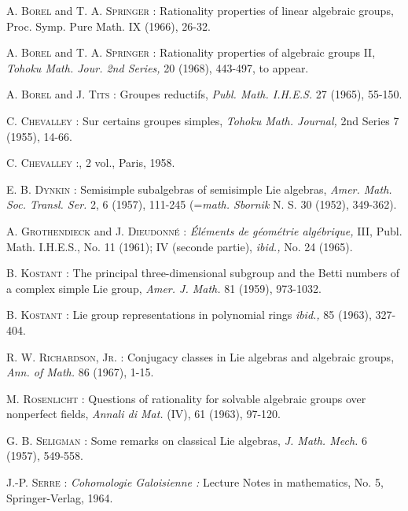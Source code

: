 \begin{thebibliography}{99}
 \textsc{A. Borel} and \textsc{T. A. Springer :} Rationality properties of linear algebraic groups, {\rm Proc. Symp. Pure Math.} IX (1966), 26-32.

 \textsc{A. Borel} and \textsc{T. A. Springer :} Rationality properties of algebraic groups II, {\em Tohoku Math. Jour. 2nd Series,} 20 (1968), 443-497, to appear.

 \textsc{A. Borel} and \textsc{J. Tits :} Groupes reductifs, {\em Publ. Math. I.H.E.S.} 27 (1965), 55-150.

 \textsc{C. Chevalley :} Sur certains groupes simples, {\em Tohoku Math. Journal,} 2nd Series 7 (1955), 14-66.

 \textsc{C. Chevalley :}, 2 vol., Paris, 1958.

 \textsc{E. B. Dynkin :} Semisimple subalgebras of semisimple Lie algebras, {\em Amer. Math. Soc. Transl. Ser.} 2, 6 (1957), 111-245 (={\em math. Sbornik} N. S. 30 (1952), 349-362).

 \textsc{A. Grothendieck} and \textsc{J. Dieudonn\'e :} {\em \'El\'ements de g\'eom\'etrie alg\'ebrique,} III, Publ. Math. I.H.E.S., No. 11 (1961); IV (seconde partie), {\em ibid.,} No. 24 (1965).

 \textsc{B. Kostant :} The principal three-dimensional subgroup and the Betti numbers of a complex simple Lie group, {\em Amer. J. Math.} 81 (1959), 973-1032.

 \textsc{B. Kostant :} Lie group representations in polynomial rings {\em ibid.,} 85 (1963), 327-404.

 \textsc{R. W. Richardson, Jr. :} Conjugacy classes in Lie algebras and algebraic groups, {\em Ann. of Math.} 86 (1967), 1-15. 

 \textsc{M. Rosenlicht :} Questions of rationality for solvable algebraic groups over nonperfect fields, {\em Annali di Mat.} (IV), 61 (1963), 97-120.

 \textsc{G. B. Seligman :} Some remarks on classical Lie algebras, {\em J. Math. Mech.} 6 (1957), 549-558.

 \textsc{J.-P. Serre :} {\em Cohomologie Galoisienne :} Lecture Notes in mathematics, No. 5, Springer-Verlag, 1964.


\end{thebibliography}

